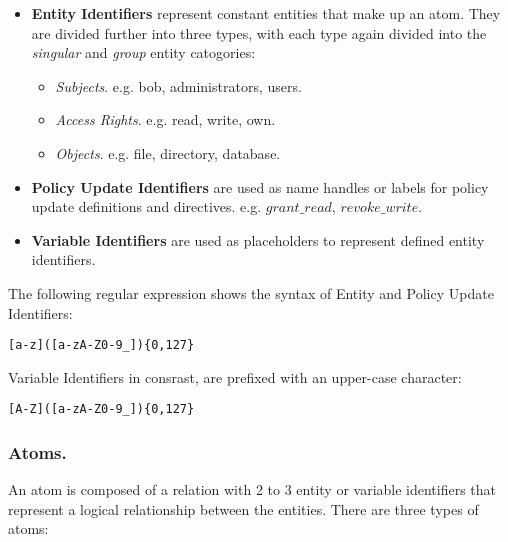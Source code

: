 \documentclass{llncs}
\begin{document}
        \begin{itemize}
          \item
            {\bf Entity Identifiers} represent constant entities that make
            up an atom. They are divided further into three types, with each
            type again divided into the {\em singular} and {\em group} entity
            catogories:
 
            \begin{itemize}
              \item
                {\em Subjects}. e.g. bob, administrators, users.
              \item
                {\em Access Rights}. e.g. read, write, own.
              \item
                {\em Objects}. e.g. file, directory, database.
            \end{itemize}
          \vspace{1mm}
          \item
            {\bf Policy Update Identifiers} are used as name handles or labels
            for policy update definitions and directives. e.g. $grant\_read$,
            $revoke\_write$.
 
          \vspace{1mm}
          \item
            {\bf Variable Identifiers} are used as placeholders to represent
            defined entity identifiers.
        \end{itemize}
 
        The following regular expression shows the syntax of Entity and
        Policy Update Identifiers:
 
        \begin{verbatim}[a-z]([a-zA-Z0-9_]){0,127}\end{verbatim}
 
        Variable Identifiers in consrast, are prefixed with an upper-case
        character:
 
        \begin{verbatim}[A-Z]([a-zA-Z0-9_]){0,127}\end{verbatim}

      \subsubsection{Atoms.}

        An atom is composed of a relation with 2 to 3 entity or variable
        identifiers that represent a logical relationship between the entities.
        There are three types of atoms:
\end{document}

